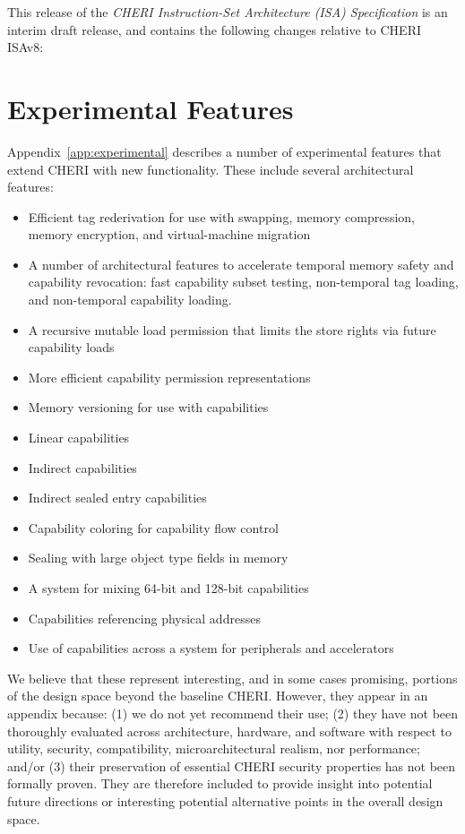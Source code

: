 This release of the \textit{CHERI Instruction-Set Architecture (ISA)
Specification} is an interim draft release, and contains the following
changes relative to CHERI ISAv8:



\section{Experimental Features}
\label{sec:intro:experimental}


Appendix~\ref{app:experimental} describes a number of experimental features
that extend CHERI with new functionality.
These include several architectural features:

\begin{itemize}
\item Efficient tag rederivation for use with swapping, memory compression,
  memory encryption, and virtual-machine migration
\item A number of architectural features to accelerate temporal memory safety
  and capability revocation: fast capability subset testing, non-temporal
  tag loading, and non-temporal capability loading.
\item A recursive mutable load permission that limits the store rights
  via future capability loads
\item More efficient capability permission representations
\item Memory versioning for use with capabilities
\item Linear capabilities
\item Indirect capabilities
\item Indirect sealed entry capabilities
\item Capability coloring for capability flow control
\item Sealing with large object type fields in memory
\item A system for mixing 64-bit and 128-bit capabilities
\item Capabilities referencing physical addresses
\item Use of capabilities across a system for peripherals and accelerators
\end{itemize}

We believe that these represent interesting, and in some cases promising,
portions of the design space beyond the baseline CHERI.
However, they appear in an appendix because: (1) we do not yet recommend their
use; (2) they have not been thoroughly evaluated across architecture,
hardware, and software with respect to utility, security, compatibility,
microarchitectural realism, nor performance; and/or (3) their preservation of
essential CHERI security properties has not been formally proven.
They are therefore included to provide insight into potential future
directions or interesting potential alternative points in the overall design
space.

